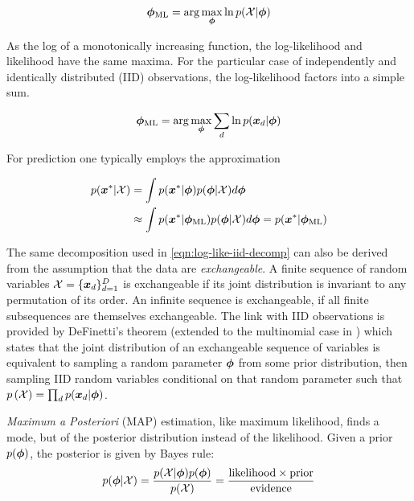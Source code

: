\begin{align}
{ { {  \bm \phi  } }_{\text{ML}} } = \arg \max_{{ \bm \phi }} \ln p({ \mathcal{X} } | { \bm \phi })
\end{align}

As the log of a monotonically increasing function, the log-likelihood and likelihood have the same maxima. For the particular case of independently and identically distributed (IID) observations, the log-likelihood factors into a simple sum.

\begin{align}
{ { {  \bm \phi  } }_{\text{ML}} } = \arg \max_{{ \bm \phi }} \sum_d \ln p({ \bm x_d } | { \bm \phi }) \label{eqn:log-like-iid-decomp}
\end{align}


For prediction one typically employs the approximation

\begin{align}
p({ \bm x^{*} } | { \mathcal{X} }) 
&= \int p({ \bm x^{*} } | { \bm \phi }) p({ \bm \phi } | { \mathcal{X} }) d{ \bm \phi } \label{eqn:ml-prediction}\\
&\approx \int p({ \bm x^{*} } | { {{ \bm \phi }}_{\text{ML}} }) p({ \bm \phi } | { \mathcal{X} }) d{ \bm \phi }
=  p({ \bm x^{*} } | { {{ \bm \phi }}_{\text{ML}} })
\end{align}

The same decomposition used in \eqref{eqn:log-like-iid-decomp} can also be derived from the assumption that the data are \emph{exchangeable}.  A finite sequence of random variables ${ \mathcal{X} } = \{{ \bm x_d }\}_{d=1}^{D}$ is exchangeable if its joint distribution is invariant to any permutation of its order. An infinite sequence is exchangeable, if all finite subsequences are themselves exchangeable. The link with IID observations is provided by DeFinetti's theorem (extended to the multinomial case in \cite{Hewitt1955}) which states that the joint distribution of an exchangeable sequence of variables is equivalent to sampling a random parameter ${ \bm \phi }$ from some prior distribution, then sampling IID random variables conditional on that random parameter such that $p\left({ \mathcal{X} }\right) = \prod_d p({ \bm x_d } | { \bm \phi })$.

\emph{Maximum a Posteriori} (MAP) estimation, like maximum likelihood, finds a mode, but of the posterior distribution instead of the likelihood. Given a prior $p({ \bm \phi })$, the posterior is given by Bayes rule:
\begin{align}
p({ \bm \phi } | { \mathcal{X} }) = \frac{p({ \mathcal{X} } | { \bm \phi })p({ \bm \phi })}{p({ \mathcal{X} })} = \frac{\text{likelihood} \times \text{prior}}{\text{evidence}}
\end{align}

